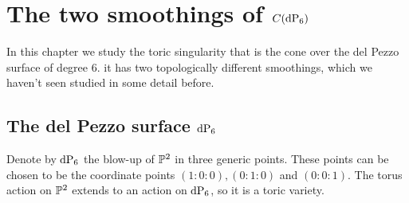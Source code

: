 \chapter{The two smoothings of \texorpdfstring{$C(\dP6)$}{C(dP6)}}

In this chapter we study the toric singularity that is the cone over the del Pezzo surface of degree $6$. it has two topologically different smoothings, which we haven't seen studied in some detail before. 

\section{The del Pezzo surface \texorpdfstring{$\dP6$}{dP6}}
\label{sec:twosmoothings}

Denote by $\dP6$ the blow-up of $\P^2$ in three generic points.  These points can be chosen to be the coordinate points $(1:0:0),(0:1:0)$ and $(0:0:1)$. The torus action on $\P^2$ extends to an action on $\dP6$, so it is a toric variety.

